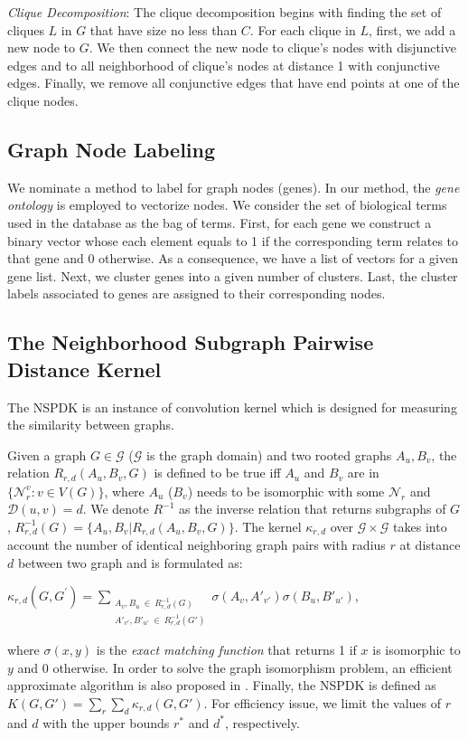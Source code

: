 \documentclass{esannV2}
\begin{document}
\textit{Clique Decomposition}: The clique decomposition begins with finding the set of cliques $L$ in $G$ that have size no less than $C$. For each clique in $L$, first, we add a new node to $G$. We then connect the new node to clique's nodes with disjunctive edges and to all neighborhood of clique's nodes at distance 1 with conjunctive edges. Finally, we remove all conjunctive edges that have end points at one of the clique nodes.
\subsection{Graph Node Labeling}
We nominate a method to label for graph nodes (genes). In our method, the \textit{gene ontology} \cite{ontology} is employed to vectorize nodes. We consider the set of biological terms used in the database as the bag of terms. First, for each gene we construct a binary vector whose each element equals to 1 if the corresponding term relates to that gene and 0 otherwise. As a consequence, we have a list of vectors for a given gene list. Next, we cluster genes into a given number of clusters. Last, the cluster labels associated to genes are assigned to their corresponding nodes.


\subsection{The Neighborhood Subgraph Pairwise Distance Kernel}
The NSPDK is an instance of convolution kernel which is designed for measuring the similarity between graphs.

Given a graph $G \in \mathcal{G}$ ($\mathcal{G}$ is the graph domain) and two rooted graphs $A_u, B_v$, the relation $R_{r,d}(A_u, B_v, G)$ is defined to be true iff $A_u$ and $B_v$ are in $\lbrace \mathcal{N}_r^v: v \in V(G) \rbrace$, where $A_u$ ($B_v$) needs to be isomorphic with some $\mathcal{N}_r$ and $\mathcal{D}(u,v)= d$. We denote $R^{-1}$ as the inverse relation that returns subgraphs of $G$, $R^{-1}_{r,d}(G) = \lbrace A_u, B_v | R_{r,d}(A_u,B_v,G)\rbrace$. The kernel $\kappa_{r,d}$ over $\mathcal{G} \times \mathcal{G}$ takes into account the number of identical neighboring graph pairs with radius $r$ at distance $d$ between two graph and is formulated as:
\begin{center}
 $\kappa_{r,d}(G,G^{'}) = \sum\limits_{\substack{A_v, B_u \ \in \ R_{r,d}^{-1}(G) \\ {A'}_{v'}, {B'}_{u'} \ \in \ R_{r,d}^{-1}(G') }} { \sigma(A_v,A'_{v'})\sigma(B_u,B'_{u'}) }$,
\end{center}
where $\sigma(x,y)$ is the \textit{exact matching function} that returns 1 if $x$ is isomorphic to $y$ and 0 otherwise. In order to solve the graph isomorphism problem, an efficient approximate algorithm is also proposed in \cite{nspdk}. Finally, the NSPDK is defined as $K(G,G') = \sum\limits_{r}{\sum\limits_{d}{\kappa_{r,d}(G,G')}}$. For efficiency issue, we limit the values of $r$ and $d$ with the upper bounds $r^*$ and $d^*$, respectively.
\end{document}
